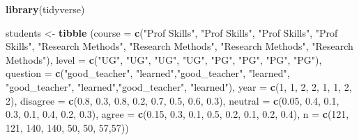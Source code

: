 \documentclass[
]{book}
\newenvironment{Shaded}{\begin{snugshade}}{\end{snugshade}}
\newcommand{\DataTypeTok}[1]{\textcolor[rgb]{0.13,0.29,0.53}{#1}}
\newcommand{\DecValTok}[1]{\textcolor[rgb]{0.00,0.00,0.81}{#1}}
\newcommand{\FloatTok}[1]{\textcolor[rgb]{0.00,0.00,0.81}{#1}}
\newcommand{\KeywordTok}[1]{\textcolor[rgb]{0.13,0.29,0.53}{\textbf{#1}}}
\newcommand{\NormalTok}[1]{#1}
\newcommand{\StringTok}[1]{\textcolor[rgb]{0.31,0.60,0.02}{#1}}
\begin{document}
\begin{Shaded}
\begin{Highlighting}[]
\KeywordTok{library}\NormalTok{(tidyverse)}

\NormalTok{students <-}\StringTok{ }\KeywordTok{tibble}\NormalTok{ (}\DataTypeTok{course =} \KeywordTok{c}\NormalTok{(}\StringTok{"Prof Skills"}\NormalTok{, }\StringTok{"Prof Skills"}\NormalTok{, }\StringTok{"Prof Skills"}\NormalTok{, }\StringTok{"Prof Skills"}\NormalTok{, }
                               \StringTok{"Research Methods"}\NormalTok{, }\StringTok{"Research Methods"}\NormalTok{, }\StringTok{"Research Methods"}\NormalTok{, }\StringTok{"Research Methods"}\NormalTok{),}
                    \DataTypeTok{level =} \KeywordTok{c}\NormalTok{(}\StringTok{"UG"}\NormalTok{, }\StringTok{"UG"}\NormalTok{, }\StringTok{"UG"}\NormalTok{, }\StringTok{"UG"}\NormalTok{,}
                              \StringTok{"PG"}\NormalTok{, }\StringTok{"PG"}\NormalTok{, }\StringTok{"PG"}\NormalTok{, }\StringTok{"PG"}\NormalTok{),}
                    \DataTypeTok{question =} \KeywordTok{c}\NormalTok{(}\StringTok{"good_teacher"}\NormalTok{, }\StringTok{"learned"}\NormalTok{,}\StringTok{"good_teacher"}\NormalTok{, }\StringTok{"learned"}\NormalTok{,}
                                 \StringTok{"good_teacher"}\NormalTok{, }\StringTok{"learned"}\NormalTok{,}\StringTok{"good_teacher"}\NormalTok{, }\StringTok{"learned"}\NormalTok{),}
                    \DataTypeTok{year =} \KeywordTok{c}\NormalTok{(}\DecValTok{1}\NormalTok{, }\DecValTok{1}\NormalTok{, }\DecValTok{2}\NormalTok{, }\DecValTok{2}\NormalTok{,}
                             \DecValTok{1}\NormalTok{, }\DecValTok{1}\NormalTok{, }\DecValTok{2}\NormalTok{, }\DecValTok{2}\NormalTok{),}
                    \DataTypeTok{disagree =} \KeywordTok{c}\NormalTok{(}\FloatTok{0.8}\NormalTok{, }\FloatTok{0.3}\NormalTok{, }\FloatTok{0.8}\NormalTok{, }\FloatTok{0.2}\NormalTok{, }\FloatTok{0.7}\NormalTok{, }\FloatTok{0.5}\NormalTok{, }\FloatTok{0.6}\NormalTok{, }\FloatTok{0.3}\NormalTok{),}
                    \DataTypeTok{neutral =} \KeywordTok{c}\NormalTok{(}\FloatTok{0.05}\NormalTok{, }\FloatTok{0.4}\NormalTok{, }\FloatTok{0.1}\NormalTok{, }\FloatTok{0.3}\NormalTok{, }\FloatTok{0.1}\NormalTok{, }\FloatTok{0.4}\NormalTok{, }\FloatTok{0.2}\NormalTok{, }\FloatTok{0.3}\NormalTok{),}
                    \DataTypeTok{agree =} \KeywordTok{c}\NormalTok{(}\FloatTok{0.15}\NormalTok{, }\FloatTok{0.3}\NormalTok{, }\FloatTok{0.1}\NormalTok{, }\FloatTok{0.5}\NormalTok{, }\FloatTok{0.2}\NormalTok{, }\FloatTok{0.1}\NormalTok{, }\FloatTok{0.2}\NormalTok{, }\FloatTok{0.4}\NormalTok{),}
                    \DataTypeTok{n =} \KeywordTok{c}\NormalTok{(}\DecValTok{121}\NormalTok{, }\DecValTok{121}\NormalTok{, }\DecValTok{140}\NormalTok{, }\DecValTok{140}\NormalTok{, }\DecValTok{50}\NormalTok{, }\DecValTok{50}\NormalTok{, }\DecValTok{57}\NormalTok{,}\DecValTok{57}\NormalTok{))  }
\end{Highlighting}
\end{Shaded}
\end{document}
